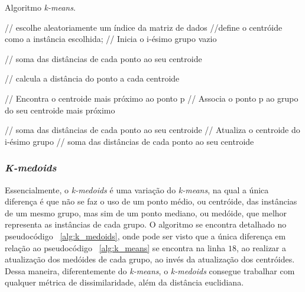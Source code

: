 \begin{algorithm}
	\caption{Algoritmo \emph{k-means}.}
	\label{alg:k_means}
	\begin{algorithmic}[1]
	
		 // escolhe aleatoriamente um índice da matriz de dados
		 //define o centróide como a instância escolhida;
		 // Inicia o i-ésimo grupo vazio
	\ENDFOR
	
	\STATE{$\phi \leftarrow \epsilon $}	// soma das distâncias de cada ponto ao seu centroide

	\WHILE{$\phi \geq \epsilon$}	
						 // calcula a distância do ponto a cada centroide
				\ENDFOR
			
					// Encontra o centroide mais próximo ao ponto p
				 // Associa o ponto p ao grupo do seu centroide mais próximo			
		\ENDFOR

			// soma das distâncias de cada ponto ao seu centroide
			 // Atualiza o centroide do i-ésimo grupo
						// soma das distâncias de cada ponto ao seu centroide
				\ENDIF
			\ENDFOR
		\ENDFOR
		
	\ENDWHILE
		
	\end{algorithmic}
\end{algorithm}

\subsubsection{\emph{K-medoids}}

Essencialmente, o \emph{k-medoids} é uma variação do \emph{k-means}, na qual a única diferença é que não se faz o uso de um ponto médio, ou centróide, das instâncias de um mesmo grupo, mas sim de um ponto mediano, ou medóide, que melhor representa as instâncias de cada grupo. O algoritmo se encontra detalhado no pseudocódigo ~\ref{alg:k_medoids}, onde pode ser visto que a única diferença em relação ao pseudocódigo ~\ref{alg:k_means} se encontra na linha $18$, ao realizar a atualização dos medóides de cada grupo, ao invés da atualização dos centróides.  Dessa maneira, diferentemente do \emph{k-means}, o \emph{k-medoids} consegue trabalhar com qualquer métrica de dissimilaridade, além da distância euclidiana.

